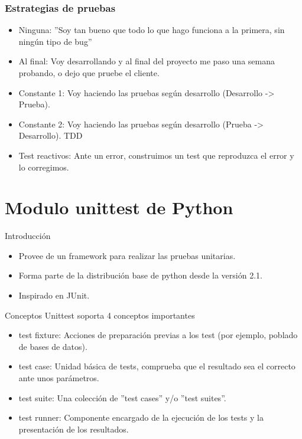 \documentclass[10pt]{beamer}
\begin{document}
  \begin{frame}
    \frametitle{Estrategias de pruebas}
    \begin{itemize}
      \item Ninguna: ''Soy tan bueno que todo lo que hago funciona a la primera, sin ningún tipo de bug''
      \item Al final: Voy desarrollando y al final del proyecto me paso una semana probando, o dejo que pruebe el cliente.
      \item Constante 1: Voy haciendo las pruebas según desarrollo (Desarrollo -> Prueba).
      \item Constante 2: Voy haciendo las pruebas según desarrollo (Prueba -> Desarrollo). TDD
      \item Test reactivos: Ante un error, construimos un test que reproduzca el error y lo corregimos.
    \end{itemize}
  \end{frame}
  
  \section*{Modulo unittest de Python}
  \begin{frame}{Introducción}
    \begin{itemize}
      \item Provee de un framework para realizar las pruebas unitarias.
      \item Forma parte de la distribución base de python desde la versión 2.1.
      \item Inspirado en JUnit.
    \end{itemize}
  \end{frame}

  \begin{frame}{Conceptos}
    Unittest soporta 4 conceptos importantes
    \begin{itemize}
      \item test fixture: Acciones de preparación previas a los test (por ejemplo, poblado de bases de datos).
      \item test case: Unidad básica de tests, comprueba que el resultado sea el correcto ante unos parámetros.
      \item test suite: Una colección de ''test cases'' y/o ''test suites''.
      \item test runner: Componente encargado de la ejecución de los tests y la presentación de los resultados.
    \end{itemize}
  \end{frame}
\end{document}
